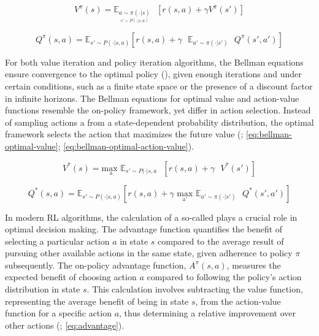 \begin{equation}
    V^{\pi}(s) = \mathbb{E}_{\underset{s' \sim P(\cdot | s, a)}{a \sim \pi(\cdot | s)}} \text{ } [r(s,a) + \gamma V^{\pi}(s')]
    \label{eq:bellman-value}
\end{equation}

\begin{equation}
    Q^{\pi}(s, a) = \mathbb{E}_{s' \sim P(\cdot | s, a)} [r(s,a) + \gamma \text{ } \mathbb{E}_{a' \sim \pi(\cdot | s')} \text{ } Q^{\pi}(s', a')]
    \label{eq:bellman-action-value}
\end{equation}

\noindent For both value iteration and policy iteration algorithms, the Bellman equations ensure convergence to the optimal policy (\textcolor{deepblue}{\cite{Sutton1998}}), given enough iterations and under certain conditions, such as a finite state space or the presence of a discount factor in infinite horizons. The Bellman equations for optimal value and action-value functions resemble the on-policy framework, yet differ in action selection. Instead of sampling actions a from a state-dependent probability distribution, the optimal framework selects the action that maximizes the future value (\textcolor{deepblue}{\cite{Sutton1998}; \autoref{eq:bellman-optimal-value}; \autoref{eq:bellman-optimal-action-value}}).

\begin{equation}
    V^{*}(s) = \underset{\text{a}}{\text{max }} \mathbb{E}_{s' \sim P(\cdot | s, a} \text{ } [r(s,a) + \gamma \text{ }V^{*}(s')]
    \label{eq:bellman-optimal-value}
\end{equation}

\begin{equation}
    Q^{*}(s, a) = \mathbb{E}_{s' \sim P(\cdot | s, a)} [r(s,a) + \gamma \underset{\text{a'}}{\text{ max }} \mathbb{E}_{a' \sim \pi(\cdot | s')} \text{ } Q^{*}(s', a')]
    \label{eq:bellman-optimal-action-value}
\end{equation}

\noindent In modern RL algorithms, the calculation of a so-called  plays a crucial role in optimal decision making. The advantage function quantifies the benefit of selecting a particular action $a$ in state $s$ compared to the average result of pursuing other available actions in the same state, given adherence to policy $\pi$ subsequently. The on-policy advantage function, $A^{\pi}(s, a)$, measures the expected benefit of choosing action $a$ compared to following the policy's action distribution in state $s$. This calculation involves subtracting the value function, representing the average benefit of being in state $s$, from the action-value function for a specific action $a$, thus determining a relative improvement over other actions (\textcolor{deepblue}{\cite{Sutton1998}; \autoref{eq:advantage}}). 

